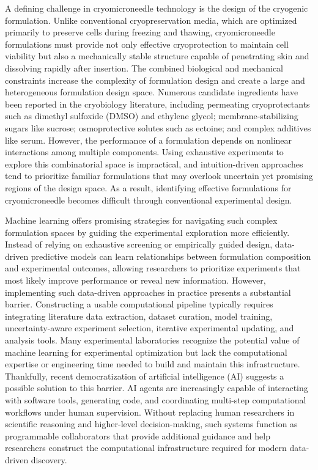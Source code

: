 \documentclass[11pt]{article}
\begin{document}
A defining challenge in cryomicroneedle technology is the design of the cryogenic formulation. Unlike conventional cryopreservation media, which are optimized primarily to preserve cells during freezing and thawing, cryomicroneedle formulations must provide not only effective cryoprotection to maintain cell viability but also a mechanically stable structure capable of penetrating skin and dissolving rapidly after insertion. The combined biological and mechanical constraints increase the complexity of formulation design and create a large and heterogeneous formulation design space. Numerous candidate ingredients have been reported in the cryobiology literature, including permeating cryoprotectants such as dimethyl sulfoxide (DMSO) and ethylene glycol; membrane-stabilizing sugars like sucrose; osmoprotective solutes such as ectoine; and complex additives like serum. However, the performance of a formulation depends on nonlinear interactions among multiple components. Using exhaustive experiments to explore this combinatorial space is impractical, and intuition-driven approaches tend to prioritize familiar formulations that may overlook uncertain yet promising regions of the design space. As a result, identifying effective formulations for cryomicroneedle becomes difficult through conventional experimental design.\cite{whaley_overview_2021,murray_chemical_2022}

Machine learning offers promising strategies for navigating such complex formulation spaces by guiding the experimental exploration more efficiently. Instead of relying on exhaustive screening or empirically guided design, data-driven predictive models can learn relationships between formulation composition and experimental outcomes, allowing researchers to prioritize experiments that most likely improve performance or reveal new information.\cite{shahriari_human_2016,frazier_tutorial_2018,tom_self_driving_2024} However, implementing such data-driven approaches in practice presents a substantial barrier. Constructing a usable computational pipeline typically requires integrating literature data extraction, dataset curation, model training, uncertainty-aware experiment selection, iterative experimental updating, and analysis tools. Many experimental laboratories recognize the potential value of machine learning for experimental optimization but lack the computational expertise or engineering time needed to build and maintain this infrastructure. Thankfully, recent democratization of artificial intelligence (AI) suggests a possible solution to this barrier. AI agents are increasingly capable of interacting with software tools, generating code, and coordinating multi-step computational workflows under human supervision. Without replacing human researchers in scientific reasoning and higher-level decision-making, such systems function as programmable collaborators that provide additional guidance and help researchers construct the computational infrastructure required for modern data-driven discovery.\cite{wang_codeact_2024,yang_swe_agent_2024,lu_end_to_end_2026}
\end{document}
